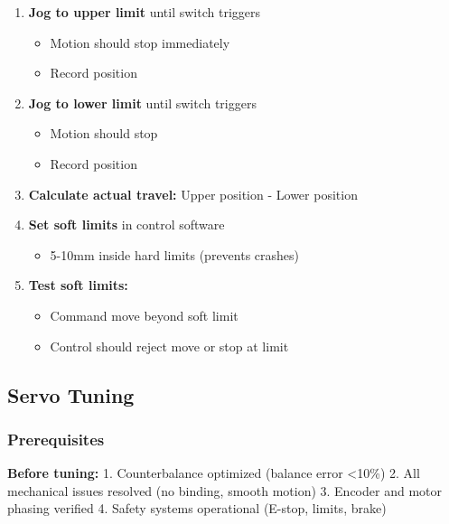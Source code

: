 \documentclass[
]{article}
\providecommand{\tightlist}{%
  \setlength{\itemsep}{0pt}\setlength{\parskip}{0pt}}
\begin{document}
\begin{enumerate}
\def\labelenumi{\arabic{enumi}.}
\tightlist
\item
  \textbf{Jog to upper limit} until switch triggers

  \begin{itemize}
  \tightlist
  \item
    Motion should stop immediately
  \item
    Record position
  \end{itemize}
\item
  \textbf{Jog to lower limit} until switch triggers

  \begin{itemize}
  \tightlist
  \item
    Motion should stop
  \item
    Record position
  \end{itemize}
\item
  \textbf{Calculate actual travel:} Upper position - Lower position
\item
  \textbf{Set soft limits} in control software

  \begin{itemize}
  \tightlist
  \item
    5-10mm inside hard limits (prevents crashes)
  \end{itemize}
\item
  \textbf{Test soft limits:}

  \begin{itemize}
  \tightlist
  \item
    Command move beyond soft limit
  \item
    Control should reject move or stop at limit
  \end{itemize}
\end{enumerate}

\subsection{Servo Tuning}\label{servo-tuning}

\subsubsection{Prerequisites}\label{prerequisites}

\textbf{Before tuning:} 1. Counterbalance optimized (balance error
\textless10\%) 2. All mechanical issues resolved (no binding, smooth
motion) 3. Encoder and motor phasing verified 4. Safety systems
operational (E-stop, limits, brake)
\end{document}
